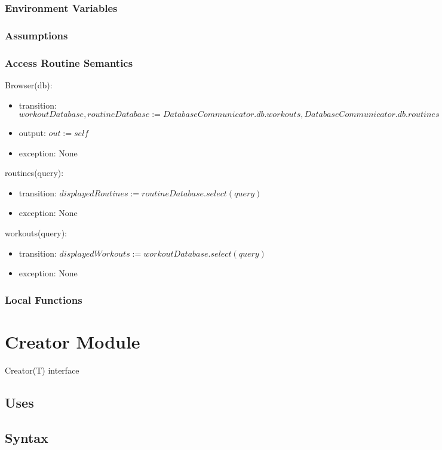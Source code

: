 \documentclass[12pt, titlepage]{article}
\begin{document}
\subsubsection{Environment Variables}

\subsubsection{Assumptions}

\subsubsection{Access Routine Semantics}

\noindent Browser(db):
\begin{itemize}
	\item transition: $workoutDatabase, routineDatabase := DatabaseCommunicator.db.workouts, DatabaseCommunicator.db.routines$
	\item output: $out := self$
	\item exception: None
\end{itemize}

\noindent routines(query):
\begin{itemize}
	\item transition: $displayedRoutines := routineDatabase.select(query)$
	\item exception: None
\end{itemize}

\noindent workouts(query):
\begin{itemize}
	\item transition: $displayedWorkouts := workoutDatabase.select(query)$
	\item exception: None
\end{itemize}

\subsubsection{Local Functions}

\newpage

\section{Creator Module}
Creator(T) interface
\subsection{Uses}

\subsection{Syntax}
\end{document}
